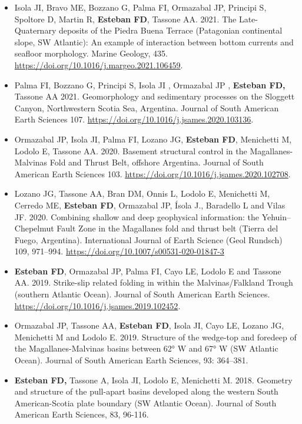 \documentclass[11pt, a4paper]{article}
\begin{document}
\begin{itemize}
  \item Isola JI, Bravo ME, Bozzano G, Palma FI, Ormazabal JP, Principi S, Spoltore D, Martin R, \textbf{Esteban FD}, Tassone AA. 2021. The Late-Quaternary deposits of the Piedra Buena Terrace (Patagonian continental slope, SW Atlantic): An example of interaction between bottom currents and seafloor morphology. Marine Geology, 435. \url{https://doi.org/10.1016/j.margeo.2021.106459}.

  \item Palma FI, Bozzano G, Principi S, Isola JI , Ormazabal JP , \textbf{Esteban FD,} Tassone AA 2021. Geomorphology and sedimentary processes on the Sloggett Canyon, Northwestern Scotia Sea, Argentina. Journal of South American Earth Sciences 107. \url{https://doi.org/10.1016/j.jsames.2020.103136}.

  \item Ormazabal JP, Isola JI, Palma FI, Lozano JG, \textbf{Esteban FD}, Menichetti M, Lodolo E, Tassone AA. 2020. Basement structural control in the Magallanes-Malvinas Fold and Thrust Belt, offshore Argentina. Journal of South American Earth Sciences 103. \url{https://doi.org/10.1016/j.jsames.2020.102708}.

  \item Lozano JG, Tassone AA, Bran DM, Onnis L, Lodolo E, Menichetti M, Cerredo ME, \textbf{Esteban FD}, Ormazabal JP, Ísola J., Baradello L and Vilas JF. 2020. Combining shallow and deep geophysical information: the Yehuin–Chepelmut Fault Zone in the Magallanes fold and thrust belt (Tierra del Fuego, Argentina). International Journal of Earth Science (Geol Rundsch) 109, 971–994. \url{https://doi.org/10.1007/s00531-020-01847-3}

  \item \textbf{Esteban FD}, Ormazabal JP, Palma FI, Cayo LE, Lodolo E and Tassone AA. 2019. Strike-slip related folding in within the Malvinas/Falkland Trough (southern Atlantic Ocean). Journal of South American Earth Sciences. \url{https://doi.org/10.1016/j.jsames.2019.102452}.

  \item Ormazabal JP, Tassone AA, \textbf{Esteban FD}, Isola JI, Cayo LE, Lozano JG, Menichetti M and Lodolo E. 2019. Structure of the wedge-top and foredeep of the Magallanes-Malvinas basins between 62° W and 67° W (SW Atlantic Ocean). Journal of South American Earth Sciences, 93: 364–381.

  \item \textbf{Esteban FD,} Tassone A, Isola JI, Lodolo E, Menichetti M. 2018. Geometry and structure of the pull-apart basins developed along the western South American-Scotia plate boundary (SW Atlantic Ocean). Journal of South American Earth Sciences, 83, 96-116.


\end{itemize}
\end{document}
